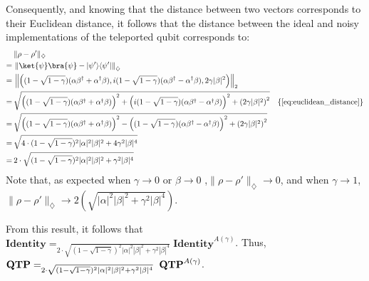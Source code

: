   Consequently, and knowing that the distance between two vectors corresponds to their Euclidean distance, it follows that the distance between the ideal and noisy implementations of the teleported qubit corresponds to:
\begin{equation}
  \begin{split}
  & \lVert \rho-\rho' \rVert_{\diamondsuit} \\
   = \hspace{2pt}&    \left\lVert  \ket{\psi}\bra{\psi} -|\psi'\rangle \langle \psi'|  \right\rVert_{\diamondsuit}  \\
   = \hspace{2pt}&    \left\lVert  \left((1-\sqrt{1-\gamma}) (\alpha \beta^{\dag}  + \alpha^{\dag} \beta) ,i(1-\sqrt{1-\gamma}) (\alpha \beta^{\dag} - \alpha^{\dag} \beta),2\gamma |\beta|^{2}\right)  \right\rVert_{2} \\
   = \hspace{2pt}&  \sqrt{ \left( (1-\sqrt{1-\gamma}) (\alpha \beta^{\dag}  + \alpha^{\dag} \beta)\right)^{2} + \left(i(1-\sqrt{1-\gamma}) (\alpha \beta^{\dag} - \alpha^{\dag} \beta)\right)^{2} + \left(2\gamma |\beta|^{2}\right)^{2}} \hspace{10pt} \{\text{\autoref{eq:euclidean_distance}}\}\\
   = \hspace{2pt}&   \sqrt{  \left( (1-\sqrt{1-\gamma}) (\alpha \beta^{\dag}  + \alpha^{\dag} \beta)\right)^{2}  - \left((1-\sqrt{1-\gamma}) (\alpha \beta^{\dag} - \alpha^{\dag} \beta)\right)^{2} + \left(2\gamma |\beta|^{2}\right)^{2}} \\
   = \hspace{2pt}&  \sqrt{  4 \cdot  (1-\sqrt{1-\gamma})^{2} |\alpha|^{2}|\beta|^{2} + 4 \gamma^{2} |\beta|^{4}} \\
   = \hspace{2pt}&  2 \cdot \sqrt{  (1-\sqrt{1-\gamma})^{2} |\alpha|^{2}|\beta|^{2} + \gamma^{2} |\beta|^{4}} \\
\end{split}
\end{equation}
Note that, as expected when $\gamma \xrightarrow{}0$ or $\beta \xrightarrow{}0$ ,$\lVert \rho-\rho' \rVert_{\diamondsuit}\xrightarrow{}0$, and when $\gamma \xrightarrow{}1$, $\lVert \rho-\rho' \rVert_{\diamondsuit}\xrightarrow{} 2 \left(\sqrt{|\alpha|^{2}|\beta|^{2} + \gamma^{2} |\beta|^{4}}\right)$.

From this result, it follows that $\textbf{Identity} =_{ 2 \cdot \sqrt{  (1-\sqrt{1-\gamma})^{2} |\alpha|^{2}|\beta|^{2}+ \gamma^{2} |\beta|^{4}}} \textbf{Identity}^{A(\gamma)}$. Thus, $ \\ \textbf{QTP} =_{2 \cdot \sqrt{  (1-\sqrt{1-\gamma})^{2} |\alpha|^{2}|\beta|^{2} + \gamma^{2} |\beta|^{4}}} \hspace{3pt}\textbf{QTP}^{A(\gamma)}$.

